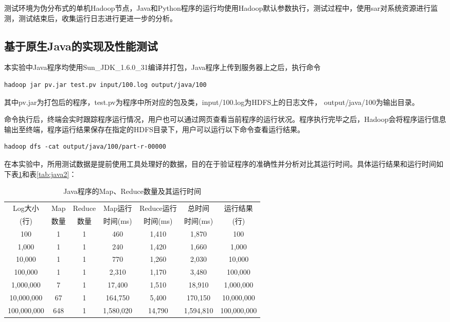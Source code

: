 测试环境为伪分布式的单机Hadoop节点，Java和Python程序的运行均使用Hadoop默认参数执行，测试过程中，使用sar对系统资源进行监测，测试结束后，收集运行日志进行更进一步的分析。


\subsection{基于原生Java的实现及性能测试}
本实验中Java程序均使用Sun\_JDK\_1.6.0\_31编译并打包，Java程序上传到服务器上之后，执行命令

\begin{verbatim}
hadoop jar pv.jar test.pv input/100.log output/java/100
\end{verbatim}

其中pv.jar为打包后的程序，test.pv为程序中所对应的包及类，input/100.log为HDFS上的日志文件， output/java/100为输出目录。

命令执行后，终端会实时跟踪程序运行情况，用户也可以通过网页查看当前程序的运行状况。程序执行完毕之后，Hadoop会将程序运行信息输出至终端，程序运行结果保存在指定的HDFS目录下，用户可以运行以下命令查看运行结果。
\begin{verbatim}
hadoop dfs -cat output/java/100/part-r-00000
\end{verbatim}
在本实验中，所用测试数据是提前使用工具处理好的数据，目的在于验证程序的准确性并分析对比其运行时间。具体运行结果和运行时间如下表\ref{tab:java1}和表\ref{tab:java2}：

\begin{table}[htbp]
 \caption{\label{tab:java1}Java程序的Map、Reduce数量及其运行时间}
 \centering
 \begin{tabular}{ccccccc}
  \toprule
  Log大小 & Map & Reduce & Map运行 & Reduce运行 & 总时间 & 运行结果\\
  (行) & 数量 & 数量 & 时间(ms) & 时间(ms) & 时间(ms) & (行)\\
  \midrule
  100 & 1 & 1 & 460 & 1,410 & 1,870 & 100\\
  1,000 & 1 & 1 & 240 & 1,420 & 1,660 & 1,000\\
  10,000 & 1 & 1 & 770 & 1,260 & 2,030 & 10,000\\
  100,000 & 1 & 1 & 2,310 & 1,170 & 3,480 & 100,000\\
  1,000,000 & 7 & 1 & 17,400 & 1,510 & 18,910 & 1,000,000\\
  10,000,000 & 67 & 1 & 164,750 & 5,400 & 170,150 & 10,000,000\\
  100,000,000 & 648 & 1 & 1,580,020 & 14,790 & 1,594,810 & 100,000,000\\
  \bottomrule
 \end{tabular}
\end{table}


